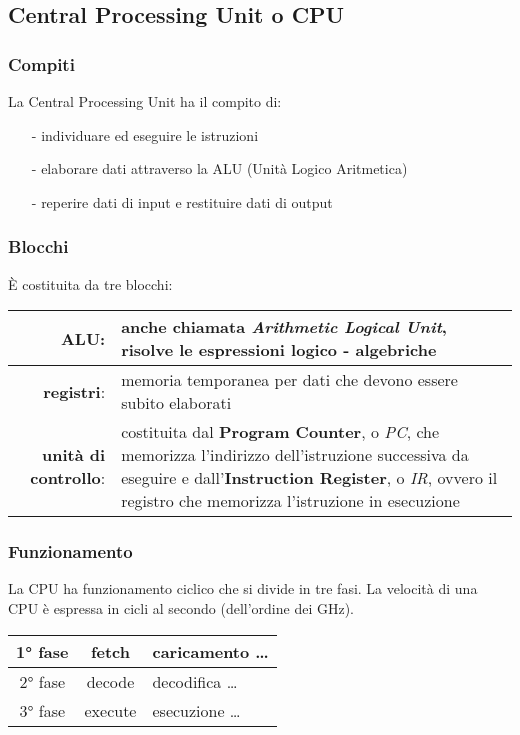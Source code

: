 \documentclass{article}
\begin{document}
\subsection{Central Processing Unit o CPU}
\subsubsection*{Compiti}
La Central Processing Unit ha il compito di:
\begin{itemize}[topsep=5pt, itemsep=0pt]
	\item[-] individuare ed eseguire le istruzioni
	\item[-] elaborare dati attraverso la ALU (Unità Logico Aritmetica)
	\item[-] reperire dati di input e restituire dati di output
\end{itemize}

\subsubsection*{Blocchi}
È costituita da tre blocchi:
\begin{center}	
	\begin{tabularx}{\textwidth}{r X}
		\textbf{ALU}: & anche chiamata \textit{Arithmetic Logical Unit}, risolve le espressioni logico - algebriche \\
		\midrule
		\textbf{registri}: & memoria temporanea per dati che devono essere subito elaborati \\
		\midrule
		\textbf{unità di controllo}: & costituita dal \textbf{Program Counter}, o \textit{PC}, che memorizza l'indirizzo dell'istruzione successiva da eseguire e dall'\textbf{Instruction Register}, o \textit{IR}, ovvero il registro che memorizza l'istruzione in esecuzione
	\end{tabularx}
\end{center}

\subsubsection*{Funzionamento}
La CPU ha funzionamento ciclico che si divide in tre fasi. La velocità di una CPU è espressa in cicli al secondo (dell'ordine dei GHz).
\begin{center}
	\begin{tabularx}{\textwidth}{c c X}
		1° fase & fetch & caricamento \dots \\
		\midrule
		2° fase & decode & decodifica \dots \\
		\midrule
		3° fase & execute & esecuzione \dots
	\end{tabularx}
\end{center}
\end{document}

